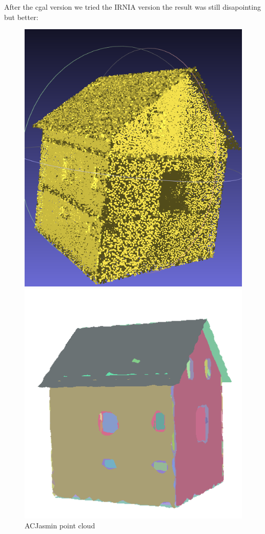 \documentclass{article}
\begin{document}
After the cgal version we tried the IRNIA version the result was still disapointing but better: 
\vspace{\baselineskip}
\begin{figure}[H]
  \centering
  \begin{minipage}[t]{0.29\textwidth}
    \includegraphics[width=\textwidth]{../../images/screen_kinetic/ACJasmin_point_cloud.png}
    \caption*{ACJasmin point cloud}
  \end{minipage}
  \begin{minipage}[t]{0.29\textwidth}
    \includegraphics[width=\textwidth]{../../images/screen_kinetic/ACJasmin_primitive.png}

\end{minipage}
\end{figure}
\end{document}
